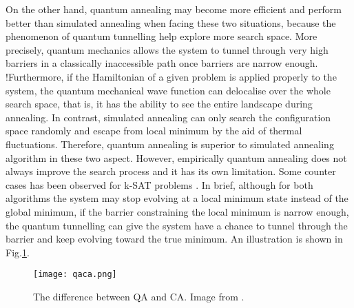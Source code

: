 \documentclass[twoside,a4paper,article]{combine}
\begin{document}
On the other hand, quantum annealing may become more efficient and perform better than simulated annealing when facing these two situations, because the phenomenon of quantum tunnelling help explore more search space. More precisely, quantum mechanics allows the system to tunnel through very high barriers in a classically inaccessible path once barriers are narrow enough. !Furthermore, if the Hamiltonian of a given problem is applied properly to the system, the quantum mechanical wave function can delocalise over the whole search space, that is, it has the ability to see the entire landscape during annealing. In contrast, simulated annealing can only search the configuration space randomly and escape from local minimum by the aid of thermal fluctuations. Therefore, quantum annealing is superior to simulated annealing algorithm in these two aspect. However, empirically quantum annealing does not always improve the search process and it has its own limitation. Some counter cases has been observed for k-SAT problems \cite{Battaglia2005}. In brief, although for both algorithms the system may stop evolving at a local minimum state instead of the global minimum, if the barrier constraining the local minimum is narrow enough, the quantum tunnelling can give the system have a chance to tunnel through the barrier and keep evolving toward the true minimum. An illustration is shown in Fig.\ref{diff_qa_ca}. \\ 

\begin{figure}[h]
	\centering
	\texttt{[image: qaca.png]}
	\caption{The difference between QA and CA. Image from \cite{Das2008}. }
	\label{diff_qa_ca}
\end{figure}



 

\end{document}
